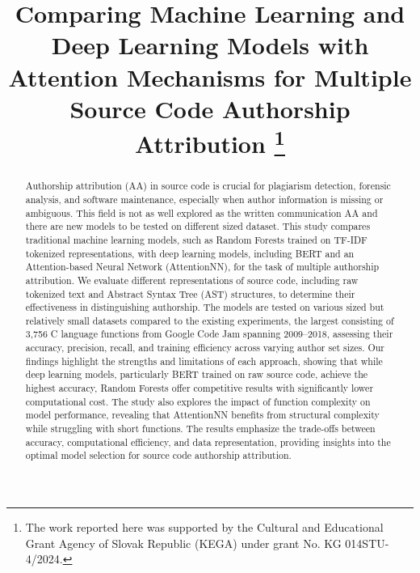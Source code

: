 \documentclass[conference]{IEEEtran}
\begin{document}
\title{Comparing Machine Learning and Deep Learning Models with Attention Mechanisms for Multiple Source Code Authorship Attribution
\thanks{The work reported here was supported by the Cultural and Educational Grant Agency of Slovak Republic (KEGA) under grant No. KG 014STU-4/2024.}
}

\author{
\and
{}
}

\maketitle

\begin{abstract}
    Authorship attribution (AA) in source code is crucial for plagiarism detection, 
    forensic analysis, and software maintenance, especially when author 
    information is missing or ambiguous. This field is not as well explored 
    as the written communication AA and there are new models to be tested 
    on different sized dataset. This study compares traditional 
    machine learning models, such as Random Forests trained on TF-IDF 
    tokenized representations, with deep learning models, including BERT 
    and an Attention-based Neural Network (AttentionNN), for the task of 
    multiple authorship attribution. We evaluate different representations 
    of source code, including raw tokenized text and Abstract Syntax Tree (AST) 
    structures, to determine their effectiveness in distinguishing authorship. 
    The models are tested on various sized but relatively small datasets compared to the existing experiments, 
    the largest consisting of 3,756 C language functions from 
    Google Code Jam spanning 2009–2018, assessing their accuracy, precision, 
    recall, and training efficiency across varying author set sizes. 
    Our findings highlight the strengths and limitations of each approach, 
    showing that while deep learning models, particularly BERT trained on 
    raw source code, achieve the highest accuracy, Random Forests offer 
    competitive results with significantly lower computational cost. 
    The study also explores the impact of function complexity on model 
    performance, revealing that AttentionNN benefits from structural 
    complexity while struggling with short functions. The results emphasize 
    the trade-offs between accuracy, computational efficiency, and data 
    representation, providing insights into the optimal model selection 
    for source code authorship attribution. 
\end{abstract}
\end{document}
